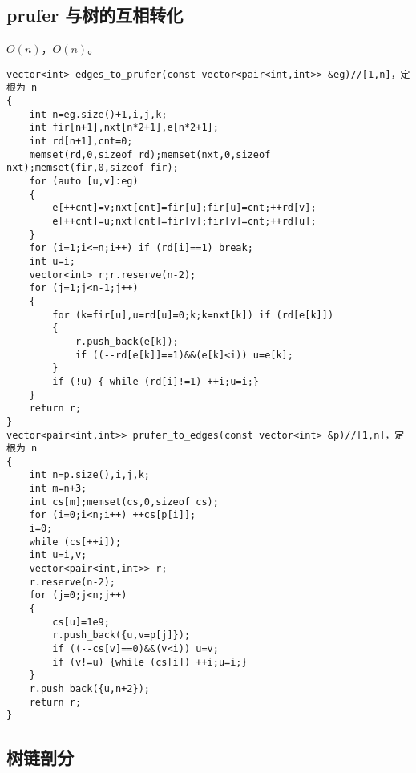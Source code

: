 \documentclass{ctexart}
\begin{document}
\subsection{prufer 与树的互相转化}

$O(n)$，$O(n)$。

\begin{lstlisting}
vector<int> edges_to_prufer(const vector<pair<int,int>> &eg)//[1,n]，定根为 n
{
	int n=eg.size()+1,i,j,k;
	int fir[n+1],nxt[n*2+1],e[n*2+1];
	int rd[n+1],cnt=0;
	memset(rd,0,sizeof rd);memset(nxt,0,sizeof nxt);memset(fir,0,sizeof fir);
	for (auto [u,v]:eg)
	{
		e[++cnt]=v;nxt[cnt]=fir[u];fir[u]=cnt;++rd[v];
		e[++cnt]=u;nxt[cnt]=fir[v];fir[v]=cnt;++rd[u];
	}
	for (i=1;i<=n;i++) if (rd[i]==1) break;
	int u=i;
	vector<int> r;r.reserve(n-2);
	for (j=1;j<n-1;j++)
	{	
		for (k=fir[u],u=rd[u]=0;k;k=nxt[k]) if (rd[e[k]]) 
		{
			r.push_back(e[k]);
			if ((--rd[e[k]]==1)&&(e[k]<i)) u=e[k];
		}
		if (!u) { while (rd[i]!=1) ++i;u=i;}
	}
	return r;
}
vector<pair<int,int>> prufer_to_edges(const vector<int> &p)//[1,n]，定根为 n
{
	int n=p.size(),i,j,k;
	int m=n+3;
	int cs[m];memset(cs,0,sizeof cs);
	for (i=0;i<n;i++) ++cs[p[i]];
	i=0;
	while (cs[++i]);
	int u=i,v;
	vector<pair<int,int>> r;
	r.reserve(n-2);
	for (j=0;j<n;j++)
	{
		cs[u]=1e9;
		r.push_back({u,v=p[j]});
		if ((--cs[v]==0)&&(v<i)) u=v;
		if (v!=u) {while (cs[i]) ++i;u=i;}
	}
	r.push_back({u,n+2});
	return r;
}

\end{lstlisting}

\subsection{树链剖分}
\end{document}
